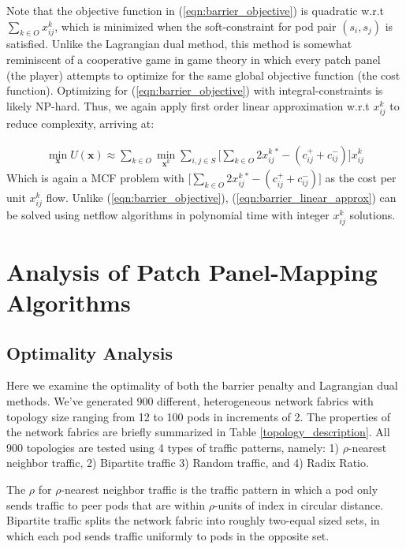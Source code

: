\documentclass[sigconf]{acmart}
\theoremstyle{definition}
\begin{document}
Note that the objective function in (\ref{eqn:barrier_objective}) is quadratic w.r.t $\sum\limits_{k \in O}x_{ij}^k$, which is minimized when the soft-constraint for pod pair $(s_i, s_j)$ is satisfied. Unlike the Lagrangian dual method, this method is somewhat reminiscent of a cooperative game in game theory in which every patch panel (the player) attempts to optimize for the same global objective function (the cost function). Optimizing for (\ref{eqn:barrier_objective}) with integral-constraints is likely NP-hard. Thus, we again apply first order linear approximation w.r.t $x_{ij}^k$ to reduce complexity, arriving at:

\begin{equation}
\begin{aligned}
\min\limits_{\mathbf{x}} U(\mathbf{x}) \approx \sum\limits_{k \in O} \min\limits_{\mathbf{x}^k} \sum\limits_{i, j \in S} \big[\sum\limits_{k \in O}2x_{ij}^k{}^* - (c_{ij}^+ + c_{ij}^-)\big]x_{ij}^k
\end{aligned}\label{eqn:barrier_linear_approx}
\end{equation}
Which is again a MCF problem with $\big[\sum\limits_{k \in O}2x_{ij}^k{}^* - (c_{ij}^+ + c_{ij}^-)\big]$ as the cost per unit $x_{ij}^k$ flow. Unlike (\ref{eqn:barrier_objective}), (\ref{eqn:barrier_linear_approx}) can be solved using netflow algorithms in polynomial time with integer $x_{ij}^k$ solutions.


\section{Analysis of Patch Panel-Mapping Algorithms}\label{section_reconfiguration_algo_analysis}
\subsection{Optimality Analysis}
Here we examine the optimality of both the barrier penalty and Lagrangian dual methods. We've generated 900 different, heterogeneous network fabrics with topology size ranging from 12 to 100 pods in increments of 2. The properties of the network fabrics are briefly summarized in Table \ref{topology_description}. All 900 topologies are tested using 4 types of traffic patterns, namely: 1) $\rho$-nearest neighbor traffic, 2) Bipartite traffic 3) Random traffic, and 4) Radix Ratio.

The $\rho$ for $\rho$-nearest neighbor traffic is the traffic pattern in which a pod only sends traffic to peer pods that are within $\rho$-units of index in circular distance. Bipartite traffic splits the network fabric into roughly two-equal sized sets, in which each pod sends traffic uniformly to pods in the opposite set.
\end{document}
